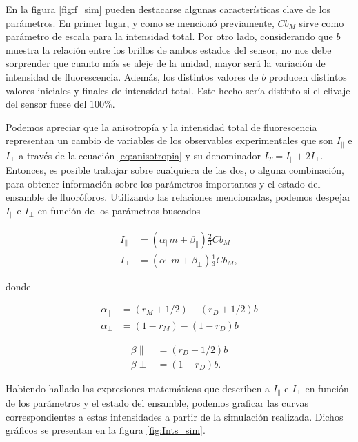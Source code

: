 En la figura \ref{fig:f_sim} pueden destacarse algunas características clave de los parámetros. En primer lugar, y como se mencionó previamente, $C b_M$ sirve como parámetro de escala para la intensidad total. Por otro lado, considerando que $b$ muestra la relación entre los brillos de ambos estados del sensor, no nos debe sorprender que cuanto más se aleje de la unidad, mayor será la variación de intensidad de fluorescencia. Además, los distintos valores de $b$ producen distintos valores iniciales y finales de intensidad total. Este hecho sería distinto si el clivaje del sensor fuese del $100\%$.

Podemos apreciar que la anisotropía y la intensidad total de fluorescencia representan un cambio de variables de los observables experimentales que son $I_{\parallel}$ e $I_{\perp}$ a través de la ecuación \ref{eq:anisotropia} y su denominador $I_T = I_{\parallel} +2 I_{\perp}$. Entonces, es posible trabajar sobre cualquiera de las dos, o alguna combinación, para obtener información sobre los parámetros importantes y el estado del ensamble de fluoróforos. Utilizando las relaciones mencionadas, podemos despejar $I_{\parallel}$ e $I_{\perp}$ en función de los parámetros buscados

\begin{align}
    I_{\parallel} &= (\alpha_{\parallel} m + \beta_{\parallel}) \frac{2}{3}Cb_M \label{eq:Int_par}\\
    I_{\perp} &= (\alpha_{\perp} m + \beta_{\perp}) \frac{1}{3} Cb_M,\label{eq:Int_per}
\end{align}

\noindent donde

\begin{multicols}{1}

\begin{align}
    \alpha_{\parallel} & = (r_M + 1/2) - (r_D + 1/2) b\\
    \alpha_{\perp}     & = (1 - r_M) - (1 - r_D) b
\end{align}

\begin{align}
    \beta{\parallel}   & = (r_D + 1/2) b\\
    \beta{\perp}       & = (1 - r_D) b.
\end{align}

\end{multicols}

Habiendo hallado las expresiones matemáticas que describen a $I_{\parallel}$ e $I_{\perp}$ en función de los parámetros y el estado del ensamble, podemos graficar las curvas correspondientes a estas intensidades a partir de la simulación realizada. Dichos gráficos se presentan en la figura \ref{fig:Ints_sim}.

